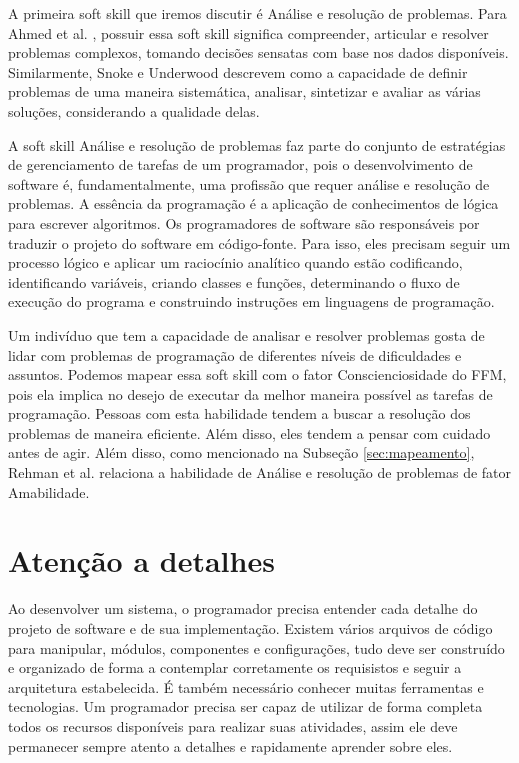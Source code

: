 A primeira soft skill que iremos discutir é Análise e resolução de problemas. Para Ahmed et al. \cite{ahmed:12}, possuir essa soft skill significa compreender, articular e resolver problemas complexos, tomando decisões sensatas com base nos dados disponíveis. Similarmente, Snoke e Underwood \cite{snoke:01} descrevem como a capacidade de definir problemas de uma maneira sistemática, analisar, sintetizar e avaliar as várias soluções, considerando a qualidade delas.

A soft skill Análise e resolução de problemas faz parte do conjunto de estratégias de gerenciamento de tarefas de um programador, pois o desenvolvimento de software é, fundamentalmente, uma profissão que requer análise e resolução de problemas. A essência da programação é a aplicação de conhecimentos de lógica para escrever algoritmos. Os programadores de software são responsáveis por traduzir o projeto do software em código-fonte. Para isso, eles precisam seguir um processo lógico e aplicar um raciocínio analítico quando estão codificando, identificando variáveis, criando classes e funções, determinando o fluxo de execução do programa e construindo instruções em linguagens de programação. 

Um indivíduo que tem a capacidade de analisar e resolver problemas gosta de lidar com problemas de programação de diferentes níveis de dificuldades e assuntos.
Podemos mapear essa soft skill com o fator Conscienciosidade do FFM, pois ela implica no desejo de executar da melhor maneira possível as tarefas de programação. Pessoas com esta habilidade tendem a buscar a resolução dos problemas de maneira eficiente. Além disso, eles tendem a pensar com cuidado antes de agir. Além disso, como mencionado na Subseção \ref{sec:mapeamento}, Rehman et al. \cite{rehman:12} relaciona a habilidade de Análise e resolução de problemas de fator Amabilidade.

\section{Atenção a detalhes}

Ao desenvolver um sistema, o programador precisa entender cada detalhe do projeto de software e de sua implementação. Existem vários arquivos de código para manipular, módulos, componentes e configurações, tudo deve ser construído e organizado de forma a contemplar corretamente os requisistos e seguir a arquitetura estabelecida. É também necessário conhecer muitas ferramentas e tecnologias. Um programador precisa ser capaz de utilizar de forma completa todos os recursos disponíveis para realizar suas atividades, assim ele deve permanecer sempre atento a detalhes e rapidamente aprender sobre eles.


